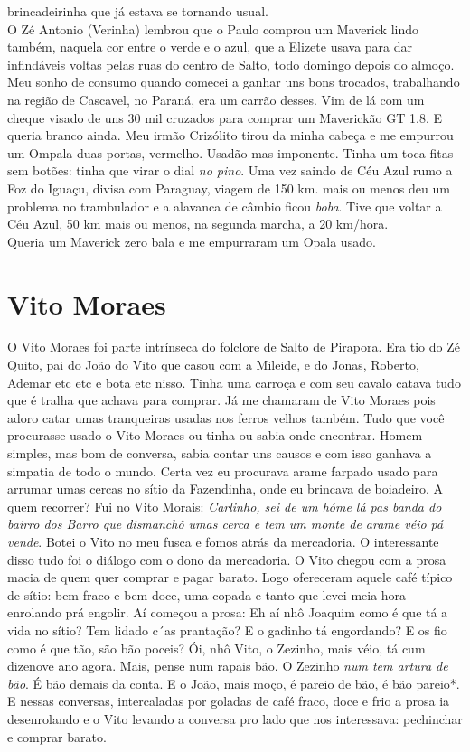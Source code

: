 \documentclass[12pt,brazil,]{book}
\begin{document}
brincadeirinha que já estava se tornando usual.\\
O Zé Antonio (Verinha) lembrou que o Paulo comprou um Maverick lindo
também, naquela cor entre o verde e o azul, que a Elizete usava para dar
infindáveis voltas pelas ruas do centro de Salto, todo domingo depois do
almoço. Meu sonho de consumo quando comecei a ganhar uns bons trocados,
trabalhando na região de Cascavel, no Paraná, era um carrão desses. Vim
de lá com um cheque visado de uns 30 mil cruzados para comprar um
Maverickão GT 1.8. E queria branco ainda. Meu irmão Crizólito tirou da
minha cabeça e me empurrou um Ompala duas portas, vermelho. Usadão mas
imponente. Tinha um toca fitas sem botões: tinha que virar o dial
\emph{no pino}. Uma vez saindo de Céu Azul rumo a Foz do Iguaçu, divisa
com Paraguay, viagem de 150 km. mais ou menos deu um problema no
trambulador e a alavanca de câmbio ficou \emph{boba}. Tive que voltar a
Céu Azul, 50 km mais ou menos, na segunda marcha, a 20 km/hora.\\
Queria um Maverick zero bala e me empurraram um Opala usado.

\section{Vito Moraes}\label{vito-moraes}

O Vito Moraes foi parte intrínseca do folclore de Salto de Pirapora. Era
tio do Zé Quito, pai do João do Vito que casou com a Mileide, e do
Jonas, Roberto, Ademar etc etc e bota etc nisso. Tinha uma carroça e com
seu cavalo catava tudo que é tralha que achava para comprar. Já me
chamaram de Vito Moraes pois adoro catar umas tranqueiras usadas nos
ferros velhos também. Tudo que você procurasse usado o Vito Moraes ou
tinha ou sabia onde encontrar. Homem simples, mas bom de conversa, sabia
contar uns causos e com isso ganhava a simpatia de todo o mundo. Certa
vez eu procurava arame farpado usado para arrumar umas cercas no sítio
da Fazendinha, onde eu brincava de boiadeiro. A quem recorrer? Fui no
Vito Morais: \emph{Carlinho, sei de um hóme lá pas banda do bairro dos
Barro que dismanchô umas cerca e tem um monte de arame véio pá vende}.
Botei o Vito no meu fusca e fomos atrás da mercadoria. O interessante
disso tudo foi o diálogo com o dono da mercadoria. O Vito chegou com a
prosa macia de quem quer comprar e pagar barato. Logo ofereceram aquele
café típico de sítio: bem fraco e bem doce, uma copada e tanto que levei
meia hora enrolando prá engolir. Aí começou a prosa: Eh aí nhô Joaquim
como é que tá a vida no sítio? Tem lidado c´as prantação? E o gadinho tá
engordando? E os fio como é que tão, são bão poceis? Ói, nhô Vito, o
Zezinho, mais véio, tá cum dizenove ano agora. Mais, pense num rapais
bão. O Zezinho \emph{num tem artura de bão}. É bão demais da conta. E o
João, mais moço, é pareio de bão, é bão pareio*. E nessas conversas,
intercaladas por goladas de café fraco, doce e frio a prosa ia
desenrolando e o Vito levando a conversa pro lado que nos interessava:
pechinchar e comprar barato.
\end{document}
